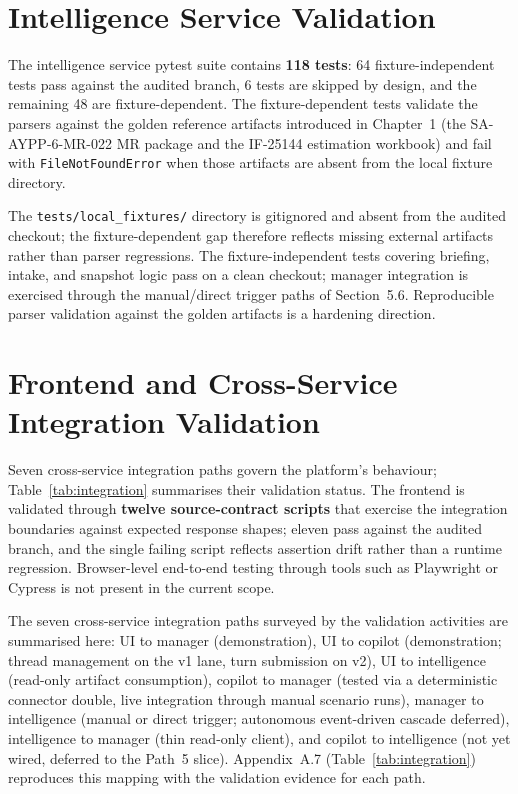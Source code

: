 \section{Intelligence Service Validation}
The intelligence service pytest suite contains \textbf{118 tests}: 64 fixture-independent tests pass against the audited branch, 6 tests are skipped by design, and the remaining 48 are fixture-dependent. The fixture-dependent tests validate the parsers against the golden reference artifacts introduced in Chapter~1 (the SA-AYPP-6-MR-022 MR package and the IF-25144 estimation workbook) and fail with \texttt{FileNotFoundError} when those artifacts are absent from the local fixture directory.

The \texttt{tests/local\_fixtures/} directory is gitignored and absent from the audited checkout; the fixture-dependent gap therefore reflects missing external artifacts rather than parser regressions. The fixture-independent tests covering briefing, intake, and snapshot logic pass on a clean checkout; manager integration is exercised through the manual/direct trigger paths of Section~5.6. Reproducible parser validation against the golden artifacts is a hardening direction.

\section{Frontend and Cross-Service Integration Validation}
Seven cross-service integration paths govern the platform's behaviour; Table~\ref{tab:integration} summarises their validation status. The frontend is validated through \textbf{twelve source-contract scripts} that exercise the integration boundaries against expected response shapes; eleven pass against the audited branch, and the single failing script reflects assertion drift rather than a runtime regression. Browser-level end-to-end testing through tools such as Playwright or Cypress is not present in the current scope.

The seven cross-service integration paths surveyed by the validation activities are summarised here: UI to manager (demonstration), UI to copilot (demonstration; thread management on the v1 lane, turn submission on v2), UI to intelligence (read-only artifact consumption), copilot to manager (tested via a deterministic connector double, live integration through manual scenario runs), manager to intelligence (manual or direct trigger; autonomous event-driven cascade deferred), intelligence to manager (thin read-only client), and copilot to intelligence (not yet wired, deferred to the Path~5 slice). Appendix~A.7 (Table~\ref{tab:integration}) reproduces this mapping with the validation evidence for each path.

